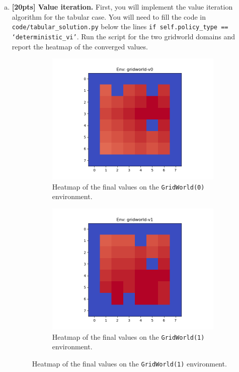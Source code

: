 \documentclass{article}
\begin{document}
\begin{enumerate}[(a)]

\item {\bf [20pts] Value iteration.} First, you will implement the value iteration algorithm for the tabular case. You will need to fill the code in \texttt{code/tabular\_solution.py} below the lines \texttt{if self.policy\_type == `deterministic\_vi'}. Run the script for the two gridworld domains and report the heatmap of the converged values.

\begin{figure}[h!]
    \centering
    \begin{subfigure}{0.45\textwidth}
        \centering
        \includegraphics[width=\textwidth]{../figures/gridworld-v0_deterministic_vi.png}
        \caption{Heatmap of the final values on the \texttt{GridWorld(0)} environment.}
    \end{subfigure}
    \hspace{0.2in}
    \begin{subfigure}{0.45\textwidth}
        \centering
        \includegraphics[width=\textwidth]{../figures/gridworld-v1_deterministic_vi.png}
        \caption{Heatmap of the final values on the \texttt{GridWorld(1)} environment.}
    \end{subfigure}
\end{figure}


\end{enumerate}
\end{document}
